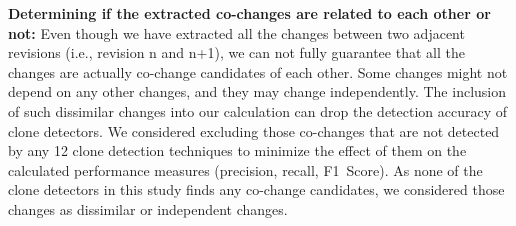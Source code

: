\documentclass[review]{elsarticle}
\begin{document}
\vspace{1mm}
\textbf{Determining if the extracted co-changes are related to each other or not:} Even though we have extracted all the changes between two adjacent revisions (i.e., revision n and n+1), we can not fully guarantee that all the changes are actually co-change candidates of each other. Some changes might not depend on any other changes, and they may change independently. The inclusion of such dissimilar changes into our calculation can drop the detection accuracy of clone detectors. We considered excluding those co-changes that are not detected by any 12 clone detection techniques to minimize the effect of them on the calculated performance measures (precision, recall, F1~Score). As none of the clone detectors in this study finds any co-change candidates, we considered those changes as dissimilar or independent changes. 
\end{document}
